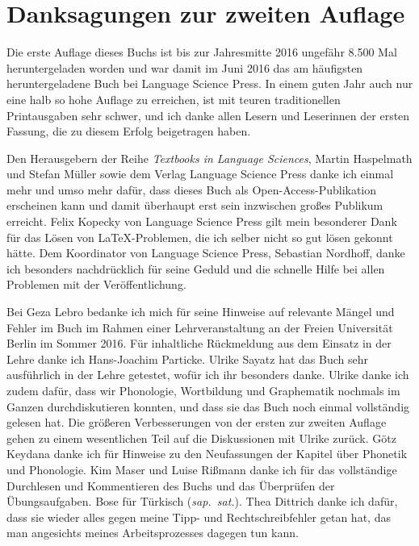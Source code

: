 \section*{Danksagungen zur zweiten Auflage}

Die erste Auflage dieses Buchs ist bis zur Jahresmitte 2016 ungefähr 8.500 Mal heruntergeladen worden und war damit im Juni 2016 das am häufigsten heruntergeladene Buch bei Language Science Press.
In einem guten Jahr auch nur eine halb so hohe Auflage zu erreichen, ist mit teuren traditionellen Printausgaben sehr schwer, und ich danke allen Lesern und Leserinnen der ersten Fassung, die zu diesem Erfolg beigetragen haben.

Den Herausgebern der Reihe \textit{Textbooks in Language Sciences}, Martin Haspelmath und Stefan Müller sowie dem Verlag Language Science Press danke ich einmal mehr und umso mehr dafür, dass dieses Buch als Open-Access-Publikation erscheinen kann und damit überhaupt erst sein inzwischen großes Publikum erreicht.
Felix Kopecky von Language Science Press gilt mein besonderer Dank für das Lösen von \LaTeX-Problemen, die ich selber nicht so gut lösen gekonnt hätte.
Dem Koordinator von Language Science Press, Sebastian Nordhoff, danke ich besonders nachdrücklich für seine Geduld und die schnelle Hilfe bei allen Problemen mit der Veröffentlichung.

\Np

Bei Geza Lebro bedanke ich mich für seine Hinweise auf relevante Mängel und Fehler im Buch im Rahmen einer Lehrveranstaltung an der Freien Universität Berlin im Sommer 2016.
Für inhaltliche Rückmeldung aus dem Einsatz in der Lehre danke ich Hans-Joachim Particke.
Ulrike Sayatz hat das Buch sehr ausführlich in der Lehre getestet, wofür ich ihr besonders danke.
Ulrike danke ich zudem dafür, dass wir Phonologie, Wortbildung und Graphematik nochmals im Ganzen durchdiskutieren konnten, und dass sie das Buch noch einmal vollständig gelesen hat.
Die größeren Verbesserungen von der ersten zur zweiten Auflage gehen zu einem wesentlichen Teil auf die Diskussionen mit Ulrike zurück.
Götz Keydana danke ich für Hinweise zu den Neufassungen der Kapitel über Phonetik und Phonologie.
Kim Maser und Luise Rißmann danke ich für das vollständige Durchlesen und Kommentieren des Buchs und das Überprüfen der Übungsaufgaben.
Bose für Türkisch (\textit{sap.\ sat.}).
Thea Dittrich danke ich dafür, dass sie wieder alles gegen meine Tipp- und Rechtschreibfehler getan hat, das man angesichts meines Arbeitsprozesses dagegen tun kann.

